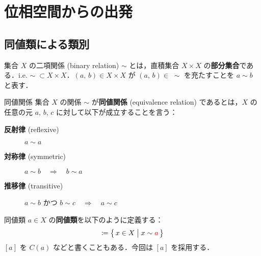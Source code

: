 \documentclass[geometry_main]{subfiles}
\begin{document}

\chapter{位相空間からの出発}

\section{同値類による類別}

集合 $X$ の二項関係 (binary relation) $\sim$ とは，直積集合 $X \times X$ の\textbf{部分集合}である．i.e. $\sim\; \subset X \times X$．$(a,\, b) \in X \times X$ が $(a,\, b) \in \; \sim$ を充たすことを $a \sim b$ と表す．

\begin{myaxiom}[label=ax.equiv]{同値関係}
	集合 $X$ の関係 $\sim$ が\textbf{同値関係} (equivalence relation) であるとは，$X$ の任意の元 $a,\, b,\, c$ に対して以下が成立することを言う：
	\begin{description}
		\item[\textbf{反射律} (reflexive)] $a \sim a$
		\item[\textbf{対称律} (symmetric)] $a \sim b \quad \Longrightarrow \quad b \sim a$
		\item[\textbf{推移律} (transitive)] $a \sim b$ かつ $b \sim c \quad \Longrightarrow \quad a \sim c$
	\end{description}
\end{myaxiom}

\begin{mydef}{同値類}
	$a \in X$ の\textbf{同値類}を以下のように定義する：
	\begin{align}
		[\textcolor{red}{a}] \coloneqq \bigl\{\, x \in X \bigm| x \sim \textcolor{red}{a} \,\bigr\}
	\end{align}
	$[a]$ を $C(a)$ などと書くこともある．今回は $[a]$ を採用する．
\end{mydef}
\end{document}
